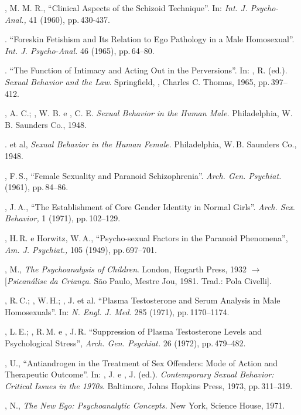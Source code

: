 \begin{bibliohedra}
, M. M. R., ``Clinical Aspects of the Schizoid
Technique''. In: \textit{Int. J. Psycho-Anal., } 41 (1960), pp.\,430-437.

. ``Foreskin Fetishism and Its Relation to Ego
Pathology in a Male Homosexual''. \textit{Int. J. Psycho-Anal. } 46
(1965), pp.\,64--80.

. ``The Function of Intimacy and Acting Out in the
Perversions''. In: , R. (ed.). \textit{Sexual Behavior and the 
Law}. Springfield, , Charles C. Thomas, 1965, pp.\,397--412.

, A. C.; , W. B. e , C. E. 
\textit{Sexual Behavior in the Human Male. }Philadelphia, W. B. Saunders Co., 1948.

. et al, \textit{Sexual Behavior in the Human Female}. 
Philadelphia, W.\,B. Saunders Co., 1948.

, F.\,S., ``Female Sexuality and Paranoid
Schizophrenia''. \textit{Arch. Gen. Psychiat. } (1961), pp.\,84--86.

, J.\,A., ``The Establishment of Core Gender Identity in
Normal Girls''. \textit{ Arch. Sex. Behavior, } 1 (1971), pp.\,102--129.

, H.\,R. e Horwitz, W.\,A., ``Psycho-sexual Factors in the
Paranoid Phenomena'', \textit{Am. J. Psychiat., } 105 (1949), pp.\,697--701.

, M., \textit{The Psychoanalysis of Children}. London, Hogarth Press, 1932
{$\bm{\rightarrow}$} [\textit{Psicanálise da Criança}. São Paulo, Mestre Jou, 1981. Trad.: Pola
Civelli].

, R.\,C.; , W.\,H.; , J. et al. ``Plasma
Testosterone and Serum Analysis in Male Homosexuals''. In: \textit{N.
Engl. J. Med. } 285 (1971), pp.\,1170--1174.

, L.\,E.; , R.\,M. e , J.\,R. ``Suppression of
Plasma Testosterone Levels and Psychological Stress'', \textit{Arch.
Gen. Psychiat.} 26 (1972), pp.\,479--482.

, U., ``Antiandrogen in the Treatment of Sex Offenders:
Mode of Action and Therapeutic Outcome''. In: , J. e 
, J. (ed.). \textit{Contemporary
Sexual Behavior: Critical Issues in the 1970s}. Baltimore, Johns Hopkins Press, 
1973, pp.\,311--319.

, N., \textit{The New Ego: Psychoanalytic Concepts. }New York, Science
House, 1971.


\end{bibliohedra}
